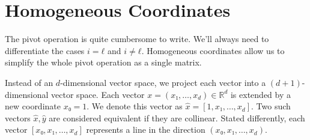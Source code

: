 \section{Homogeneous Coordinates}

The pivot operation is quite cumbersome to write.
We'll always need to differentiate the cases $i = ℓ$ and $i ≠ ℓ$.
Homogeneous coordinates allow us to simplify the whole pivot operation as a single matrix.

Instead of an $d$-dimensional vector space, we project each vector into a $(d+1)$-dimensional vector space.
Each vector $x = (x₁, …, x_d) ∈ ℝ^d$ is extended by a new coordinate $x₀ = 1$.
We denote this vector as $\hat x = [1, x₁, …, x_d]$.
Two such vectors $\hat x, \hat y$ are considered equivalent if they are collinear.
Stated differently, each vector $[x₀, x₁, …, x_d]$ represents a line in the direction $(x₀, x₁, …, x_d)$.

\begin{center}
\end{center}

